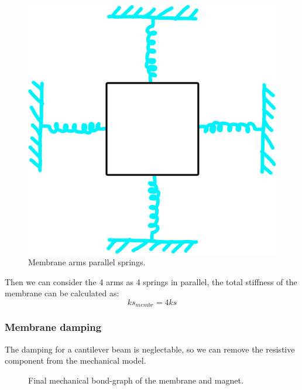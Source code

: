 \begin{figure}
    \centering
    \includegraphics[scale=0.4]{Chapters/Chapter2/Modelling_of_Entire_System/Figures/4_arms_springs.png} %
    \caption{Membrane arms parallel springs.}
    \label{fig:Membrane_springs}
\end{figure}
Then we can consider the 4 arms as 4 springs in parallel, the total stiffness of the membrane can be calculated as:
\begin{equation}
    ks_{membr} = 4 ks
\end{equation}


\subsubsection{Membrane damping}
The damping for a cantilever beam is neglectable, so we can remove the resistive component from the mechanical model.
\begin{figure}
    \centering
    \resizebox{.9\linewidth}{!}{
            
    }
    \caption{Final mechanical bond-graph of the membrane and magnet.}
    \label{fig:Membrane_bond graph_without_damping}
\end{figure}

